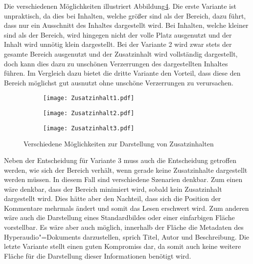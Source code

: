 Die verschiedenen Möglichkeiten illustriert Abbildung\ref{fig:Zusatzinhalt}. Die erste Variante ist unpraktisch, da dies bei Inhalten, welche größer sind als der Bereich, dazu führt, dass nur ein Ausschnitt des Inhaltes dargestellt wird. Bei Inhalten, welche kleiner sind als der Bereich, wird hingegen nicht der volle Platz ausgenutzt und der Inhalt wird unnötig klein dargestellt. Bei der Variante 2 wird zwar stets der gesamte Bereich ausgenutzt und der Zusatzinhalt wird vollständig dargestellt, doch kann dies dazu zu unschönen Verzerrungen des dargestellten Inhaltes führen. Im Vergleich dazu bietet die dritte Variante den Vorteil, dass diese den Bereich möglichst gut ausnutzt ohne unschöne Verzerrungen zu verursachen.

\begin{figure}[h!]
\begin{subfigure}[c]{0.33\textwidth}
\texttt{[image: Zusatzinhalt1.pdf]}
\label{fig:Zusatzinhalt1}
\end{subfigure}
\begin{subfigure}[c]{0.33\textwidth}
\texttt{[image: Zusatzinhalt2.pdf]}
\label{fig:Zusatzinhalt2}
\end{subfigure}
\begin{subfigure}[c]{0.33\textwidth}
\texttt{[image: Zusatzinhalt3.pdf]}
\label{fig:Zusatzinhalt3}
\end{subfigure}
\caption{Verschiedene Möglichkeiten zur Darstellung von Zusatzinhalten}
\label{fig:Zusatzinhalt}
\end{figure}

Neben der Entscheidung für Variante 3 muss auch die Entscheidung getroffen werden, wie sich der Bereich verhält, wenn gerade keine Zusatzinhalte dargestellt werden müssen. In diesem Fall sind verschiedene Szenarien denkbar. Zum einen wäre denkbar, dass der Bereich minimiert wird, sobald kein Zusatzinhalt dargestellt wird. Dies hätte aber den Nachteil, dass sich die Position der Kommentare mehrmals ändert und somit das Lesen erschwert wird. Zum anderen wäre auch die Darstellung eines Standardbildes oder einer einfarbigen Fläche vorstellbar. Es wäre aber auch möglich, innerhalb der Fläche die Metadaten des Hyperaudio"=Dokuments darzustellen, sprich Titel, Autor und Beschreibung. Die letzte Variante stellt einen guten Kompromiss dar, da somit auch keine weitere Fläche für die Darstellung dieser Informationen benötigt wird.

